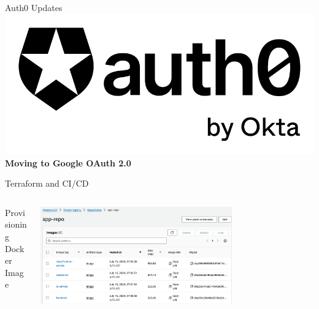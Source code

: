

\begin{frame}{Auth0 Updates}
    \centering
    \includegraphics[height=0.6\textheight,keepaspectratio]{images/mm_auth0.png}
    \vspace{1em}
    \Large
    \textbf{Moving to Google OAuth 2.0}
\end{frame}

\begin{frame}{Terraform and CI/CD}
    \begin{columns}
        \begin{column}{0.5\textwidth}
            Provisioning \\
            Docker Image
        \end{column}
        \begin{column}{0.5\textwidth}
            \includegraphics[height=0.7\textheight,width=0.7\textwidth,keepaspectratio]{images/mm_ecr.png} 
        \end{column}
    \end{columns}
\end{frame}





